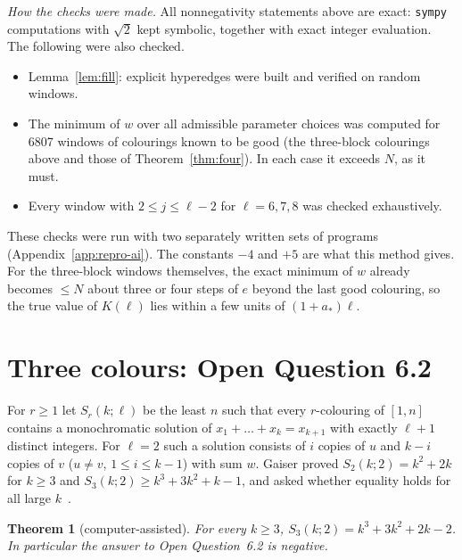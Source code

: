 \documentclass[11pt]{amsart}
\newtheorem{theorem}{Theorem}
\theoremstyle{definition}
\begin{document}
\noindent\emph{How the checks were made.} All nonnegativity statements above are exact: \texttt{sympy} computations with $\sqrt2$ kept symbolic, together with exact integer evaluation. The following were also checked.
\begin{itemize}
\item Lemma~\ref{lem:fill}: explicit hyperedges were built and verified on random windows.
\item The minimum of $w$ over all admissible parameter choices was computed for 6807 windows of colourings known to be good (the three-block colourings above and those of Theorem~\ref{thm:four}). In each case it exceeds $N$, as it must.
\item Every window with $2\le j\le\ell-2$ for $\ell=6,7,8$ was checked exhaustively.
\end{itemize}
These checks were run with two separately written sets of programs (Appendix~\ref{app:repro-ai}). The constants $-4$ and $+5$ are what this method gives. For the three-block windows themselves, the exact minimum of $w$ already becomes $\le N$ about three or four steps of $e$ beyond the last good colouring, so the true value of $K(\ell)$ lies within a few units of $(1+a_*)\ell$.

\section{Three colours: Open Question 6.2}\label{sec:oq62}

For $r\ge1$ let $S_r(k;\ell)$ be the least $n$ such that every $r$-colouring of $[1,n]$ contains a monochromatic solution of $x_1+\dots+x_k=x_{k+1}$ with exactly $\ell+1$ distinct integers. For $\ell=2$ such a solution consists of $i$ copies of $u$ and $k-i$ copies of $v$ ($u\ne v$, $1\le i\le k-1$) with sum $w$. Gaiser proved $S_2(k;2)=k^2+2k$ for $k\ge3$ and $S_3(k;2)\ge k^3+3k^2+k-1$, and asked whether equality holds for all large $k$~\cite[Open Question~6.2]{Gaiser}.

\begin{theorem}[computer-assisted]\label{thm:oq62}
For every $k\ge3$, $S_3(k;2)=k^3+3k^2+2k-2$. In particular the answer to Open Question~6.2 is negative.
\end{theorem}
\end{document}
